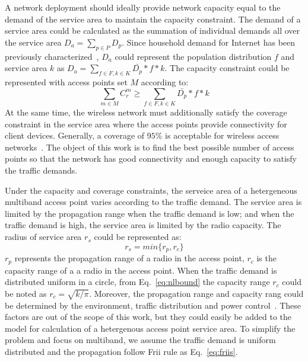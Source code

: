 A network deployment should ideally provide network capacity equal to the demand of the service 
area to maintain the capacity constraint. The demand of a service area could be calculated as the 
summation of individual demands all over the service area $D_a=\sum_{p\in P}D_p$. Since 
household demand for Internet has been previously characterized~\cite{rosston2011household}, 
$D_a$ could represent the population distribution $f$ and service area $k$ as 
$D_a=\sum_{f \in F,k \in K}\bar{D_p}*f*k$. 
The capacity constraint could be represented with access points set $M$ according to:
\begin{equation}
\label{eq:nlbound}
\sum_{m \in M}C_r^m \ge \sum_{f \in F,k \in K}\bar{D_p}*f*k
\end{equation}
At the same time, the wireless network must additionally satisfy the coverage constraint in the service 
area where the access points provide connectivity for client devices. 
Generally, a coverage of $95\%$ is acceptable for wireless access networks~\cite{robinson2010deploying}.
The object of this work is to find the best possible number of access points so that the network has good 
connectivity and enough capacity to satisfy the traffic demands.


Under the capacity and coverage constraints, the serveice area of a hetergeneous multiband access point 
varies according to the traffic demand. The service area is limited by the propagation range when the traffic 
demand is low; and when the traffic demand is high, the service area is limited by the radio capacity.
The radius of service area $r_s$ could be represented as:
\begin{equation}
\label{eq:servicearea}
r_s=min\{r_p,r_c\}
\end{equation}
$r_p$ represents the propagation range of a radio in the access point, $r_c$ is the capacity range of 
a a radio in the access point. When the traffic demand is distributed uniform in a circle, from 
Eq.~\ref{eq:nlbound} the capacity range $r_c$ could be noted as $r_c=\sqrt{k/\pi}$. Moreover,
the propagation range and capacity rang could be determined by the environment, traffic distribution and
power control~\cite{robinson2010deploying}. These factors are out of the scope of this work, but they could
easily be added to the model for calculation of a hetergenous access point service area. To simplify the 
problem and focus on multiband, we assume the traffic demand is uniform distributed and the propagation 
follow Frii rule as Eq.~\ref{eq:friis}.

